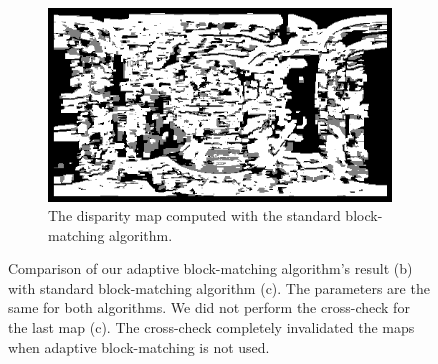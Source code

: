 \begin{figure}[h]
\begin{subfigure}{0.7\linewidth}
		\includegraphics[width=\linewidth]{img/legacy_disparity.png}
		\caption{The disparity map computed with the standard block-matching
		algorithm.}
	\end{subfigure}
\caption{Comparison of our adaptive block-matching algorithm's result (b) with
standard block-matching algorithm (c). The parameters are the same for
both algorithms. We did not perform the cross-check for the last map (c).
The cross-check completely invalidated the maps when adaptive block-matching is
not used.}
\label{fig:disparity_comparison}
\end{figure}
%
